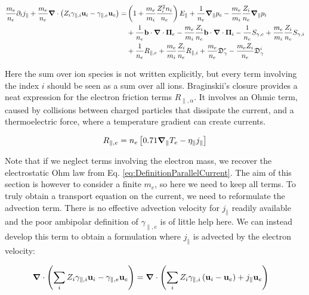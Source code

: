 \begin{align}
	\label{eq:S3X_differenceGammaeGammai}
	\frac{m_e}{n_e}\partial_t j_\parallel + \frac{m_e}{n_e}\grad\cdot\left(Z_i\gamma_{\parallel,i}\mathbf{u}_i - \gamma_{\parallel,e}\mathbf{u}_e\right) = &  
	\left(1 + \frac{m_e}{m_i}\frac{Z_i^2n_i}{n_e}\right)E_\parallel + \frac{1}{n_e}\grad_\parallel{p_e} - \frac{m_e}{m_i}\frac{Z_i}{n_e}\grad_\parallel{p_i} \nonumber \\ 
	&+ \frac{1}{n_e}\mathbf{b}\cdot\grad\cdot\boldsymbol{\Pi}_e - \frac{m_e}{m_i}\frac{Z_i}{n_e}\mathbf{b}\cdot\grad\cdot\boldsymbol{\Pi}_i - \frac{1}{n_e}S_{\gamma,e} + \frac{m_e}{m_i}\frac{Z_i}{n_e}S_{\gamma,i} \nonumber \\ 
	&+ \frac{1}{n_e}R_{\parallel,e} + \frac{m_e}{m_i}\frac{Z_i}{n_e}R_{\parallel,i} + \frac{m_e}{n_e}\mathfrak{D}_\gamma^e - \frac{m_eZ_i}{n_e}\mathfrak{D}_\gamma^i
\end{align}

Here the sum over ion species is not written explicitly, but every term involving the index $i$ should be seen as a sum over all ions. Braginskii's closure provides a neat expression for the electron friction terms $R_{\parallel,\alpha}$. It involves an Ohmic term, caused by collisions between charged particles that dissipate the current, and a thermoelectric force, where a temperature gradient can create currents. 

\begin{align}
	R_{\parallel,e} = n_e\left[0.71\grad_\parallel T_e - \eta_\parallel j_\parallel\right]
\end{align}

Note that if we neglect terms involving the electron mass, we recover the electrostatic Ohm law from Eq. \ref{eq:DefinitionParallelCurrent}. The aim of this section is however to consider a finite $m_e$, so here we need to keep all terms. To truly obtain a transport equation on the current, we need to reformulate the advection term. There is no effective advection velocity for $j_\parallel$ readily available and the poor ambipolar definition of $\gamma_{\parallel,e}$ is of little help here. We can instead develop this term to obtain a formulation where $j_\parallel$ is advected by the electron velocity:

\begin{align}
	\label{eq:S3X_advectionJPara}
	\grad\cdot\left(\sum_i Z_i\gamma_{\parallel,i}\mathbf{u}_i - \gamma_{\parallel,e}\mathbf{u}_e\right) &= \grad\cdot\left(\sum_i Z_i\gamma_{\parallel,i}\left(\mathbf{u}_i-\mathbf{u}_e\right) + j_\parallel\mathbf{u}_e\right)
\end{align}

